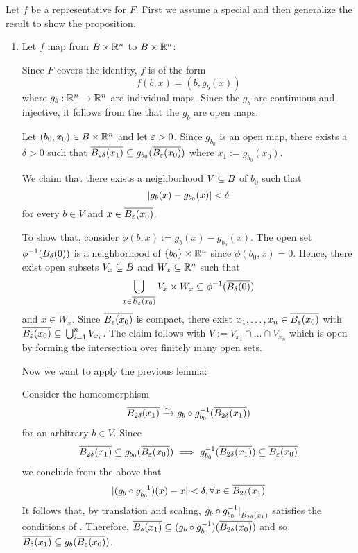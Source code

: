 \begin{myproof}
    Let $f$ be a representative for $F$.
    First we assume a special and then generalize the result to show the proposition.
    \begin{enumerate}
        \item Let $f$ map from $B \times \mathbb{R}^n$ to $B \times \mathbb{R}^n$:
        
        Since $F$ covers the identity, $f$ is of the form
        \[ f(b, x) = (b, g_b(x)) \]
        where $g_b: \mathbb{R}^n \to \mathbb{R}^n$ are individual maps.
        Since the $g_b$ are continuous and injective, it follows from the  that the $g_b$ are open maps.
        
        Let $(b_0, x_0) \in B \times \mathbb{R}^n$ and let $\varepsilon{} > 0$.
        Since $g_{b_0}$ is an open map, there exists a $\delta > 0$ such that
        $\clball[2\delta][x_1] \sub g_{b_0}(\clball[\eps][x_0])$ where $x_1 := g_{b_0}(x_0)$.

        We claim that there exists a neighborhood $V \subseteq{} B$ of $b_0$ such that
        \[ \vert{} g_b(x) - g_{b_0}(x) \vert{} < \delta \]
        for every $b \in V$ and $x \in \clball[\eps][x_0]$.
        
        To show that, consider $\phi(b, x) := g_b(x) - g_{b_0}(x)$.
        The open set $\inv{\phi}(\ball[\delta])$ is a neighborhood of $\{b_0\} \times \mathbb{R}^n$ since $\phi(b_0, x) = 0$.
        Hence, there exist open subsets $V_x \subseteq{} B$ and $W_x \subseteq{} \mathbb{R}^n$ such that
        \[ \bigcup_{x \in \clball[\eps][x_0]} V_x \times W_x \sub \inv{\phi}(\clball[\delta]) \]
        and $x \in W_x$.
        Since $\clball[\eps][x_0]$ is compact, there exist $x_1, \dots, x_n \in \clball[\eps][x_0]$ with $\clball[\eps][x_0] \sub \bigcup_{i = 1}^{n} V_{x_i}$.
        The claim follows with $V := V_{x_1} \cap \dots \cap V_{x_n}$ which is open by forming the intersection over finitely many open sets.

        Now we want to apply the previous lemma:

        Consider the homeomorphism
        \[ \clball[2\delta][x_1] \isomto g_b \circ \inv{g_{b_0}}(\clball[2\delta][x_1]) \]
        for an arbitrary $b \in V$.
        Since
        \[ \clball[2\delta][x_1] \sub g_{b_0}(\clball[\eps][x_0]) \implies \inv{g_{b_0}}(\clball[2\delta][x_1]) \sub \clball[\eps][x_0] \]
        we conclude from the above that
        \[ \abs{(g_b \circ \inv{g_{b_0}})(x) - x} < \delta, \forall x \in \clball[2\delta][x_1] \]
        It follows that, by translation and scaling, $g_b \circ \inv{g_{b_0}}\restr{\clball[2\delta][x_1]}$ satisfies the conditions of .
        Therefore, $\clball[\delta][x_1] \sub (g_b \circ \inv{g_{b_0}})(\clball[2\delta][x_0])$ and so $\clball[\delta][x_1] \sub g_b(\clball[\eps][x_0])$.


\end{enumerate}
\end{myproof}
